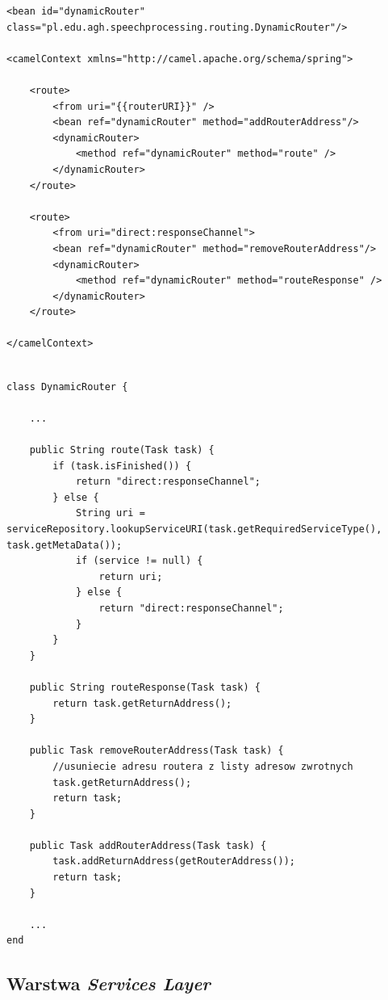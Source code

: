 \begin{center}
\begin{lstlisting}
<bean id="dynamicRouter" class="pl.edu.agh.speechprocessing.routing.DynamicRouter"/>

<camelContext xmlns="http://camel.apache.org/schema/spring">

	<route>
		<from uri="{{routerURI}}" />
		<bean ref="dynamicRouter" method="addRouterAddress"/>
		<dynamicRouter>
			<method ref="dynamicRouter" method="route" />
		</dynamicRouter>
	</route>

	<route>
		<from uri="direct:responseChannel">
		<bean ref="dynamicRouter" method="removeRouterAddress"/>
		<dynamicRouter>
			<method ref="dynamicRouter" method="routeResponse" />
		</dynamicRouter>
	</route>

</camelContext>

\end{lstlisting}
\end{center}

\lstset{language=Java, tabsize=4, caption=Implementacja metody routującej wiadomości do odpowiednich serwisów.,label=lst:router_impl}

\begin{center}
\begin{lstlisting}

class DynamicRouter {

	...

	public String route(Task task) {
		if (task.isFinished()) {
			return "direct:responseChannel";
		} else {
			String uri = serviceRepository.lookupServiceURI(task.getRequiredServiceType(), task.getMetaData());
			if (service != null) {
				return uri;
			} else {
				return "direct:responseChannel";
			}
		}
	}

	public String routeResponse(Task task) {
		return task.getReturnAddress();
	}

	public Task removeRouterAddress(Task task) {
		//usuniecie adresu routera z listy adresow zwrotnych
		task.getReturnAddress();
		return task;
	}

	public Task addRouterAddress(Task task) {
		task.addReturnAddress(getRouterAddress());
		return task;
	}

	...
end
\end{lstlisting}
\end{center}

\subsection{Warstwa \textit{Services Layer}}

